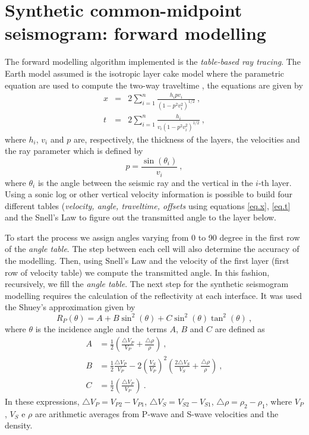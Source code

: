 \documentclass{vie16}
\begin{document}
\section{Synthetic common-midpoint seismogram: forward modelling}
The forward modelling algorithm implemented is the \textit{table-based ray 
tracing}. The Earth model assumed is the isotropic layer cake model where 
the parametric equation are used to compute the two-way traveltime 
\citep{Geyer1959}, the equations are given by
\begin{eqnarray}
x & = & 2\sum_{i=1}^{n} \frac {h_{i}pv_{i}} {(1 -
p^{2}v_{i}^{2})^{1/2}} \ ,\label{eq.x} \\
t & = & 2\sum_{i=1}^{n} \frac {h_{i}} {v_{i}(1 - p^{2}v_{i}^{2})^{1/2}} \ ,
\label{eq.t}
\end{eqnarray}
%
where $h_{i}$, $v_{i}$ and $p$ are, respectively, the thickness of the layers, 
the velocities and the ray parameter which is defined by
\begin{equation}
p = \frac{\sin(\theta_{i})}{v_{i}}\ ,\label{eq.p}
\end{equation}
where $\theta_i$ is the angle between the seismic ray and the vertical in the 
$i$-th layer. Using a sonic log or other vertical velocity information is 
possible to build four different tables (\textit{velocity, angle, traveltime, 
offsets} using equations \ref{eq.x}, \ref{eq.t} and the Snell's Law to figure out 
the transmitted angle to the layer below.

To start the process we assign angles varying from 0 to 90 degree in the first 
row of the \textit{angle table}. The step between each cell will also 
determine the accuracy of the modelling. Then, using Snell's Law and the 
velocity of the first layer (first row of velocity table) we compute the 
transmitted angle. In this fashion, recursively, we fill the \textit{angle table}. 
The next step for the synthetic seismogram modelling requires the 
calculation of the reflectivity at each interface. It was used the Shuey's 
approximation \citep{Shuey1985} given by
\begin{equation}
R_{P} (\theta) = A + B\sin^{2}(\theta) + C\sin^{2}(\theta)\tan^{2}(\theta)
\ , \label{eq.shuey}
\end{equation}
where $\theta$ is the incidence angle and the terms $A$, $B$ and $C$ are 
defined as
\begin{equation}
\begin{split}
A & = \frac{1}{2} \left(\frac{\triangle V_{P}}{V_{P}}     +
\frac{\triangle \rho}{\rho}     \right)\ , \\
B & = \frac{1}{2} \frac{\triangle V_{P}}{V_{P}}  - 2\left(\frac{
V_{S}}{V_{P}}\right)^{2}  \left(\frac{2\triangle V_{S}}{V_{S}} +
\frac{\triangle \rho}{\rho}\right)   \ , \\
C & = \frac{1}{2} \left(\frac{\triangle V_{P}}{V_{P}} \right) \ .
\end{split}
\end{equation}
In these expressions, $\triangle V_{P} = V_{P2} - V_{P1}$, $\triangle 
V_{S} = V_{S2} - V_{S1}$, $\triangle \rho = \rho_{2} - \rho_{1}$, where 
$V_{P}$, $V_{S}$ e $\rho$ are arithmetic averages from P-wave and S-wave 
velocities and the density.
\end{document}
